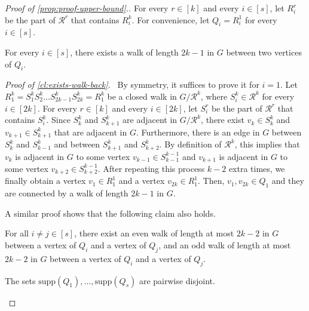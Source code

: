 \documentclass{article}
\newcommand{\supp}{\text{supp}}
\newcommand{\mydiamond}{\rotatebox[origin=c]{45}{$\vcenter{\hbox{$\Box$}}$}}
\newenvironment{subproof}[1]{\par\noindent \textit{Proof of #1.}\ }{\hfill \mydiamond \par\vspace{11pt}}
\begin{document}
\begin{proof}[Proof of \cref{prop:proof-upper-bound}.]
    For every $r \in [k]$ and every $i \in [s]$, let $R^r_i$ be the part of $\mathcal{R}^r$ that contains $R^k_i$.
    For convenience, let $Q_i = R^1_i$ for every $i \in [s]$.

    \begin{claim}\label{cl:exists-walk-back}
        For every $i \in [s]$, there exists a walk of length $2k-1$ in $G$ between two vertices of $Q_i$.
    \end{claim}

    \begin{subproof}{\cref{cl:exists-walk-back}}
        By symmetry, it suffices to prove it for $i = 1$.
        Let $R^k_1 = S^k_1S^k_2\ldots S^k_{2k-1}S^k_{2k} = R^k_1$ be a closed walk in $G/\mathcal{R}^k$, where $S^k_i \in \mathcal{R}^k$ for every $i \in [2k]$.
        For every $r \in [k]$ and every $i \in [2k]$, let $S^r_i$ be the part of $\mathcal{R}^r$ that contains $S^k_i$.
        Since $S^k_{k}$ and $S^k_{k+1}$ are adjacent in $G/\mathcal{R}^k$, there exist $v_{k} \in S^k_{k}$ and $v_{k+1} \in S^k_{k+1}$ that are adjacent in $G$.
        Furthermore, there is an edge in $G$ between $S^k_{k}$ and $S^k_{k-1}$ and between $S^k_{k+1}$ and $S^k_{k+2}$.
        By definition of $\mathcal{R}^k$, this implies that $v_{k}$ is adjacent in $G$ to some vertex $v_{k-1} \in S^{k-1}_{k-1}$ and $v_{k+1}$ is adjacent in $G$ to some vertex $v_{k+2} \in S^{k-1}_{k+2}$.
        After repeating this process $k-2$ extra times, we finally obtain a vertex $v_1 \in R^{1}_1$ and a vertex $v_{2k} \in R^{1}_1$.
        Then, $v_1, v_{2k} \in Q_1$ and they are connected by a walk of length $2k-1$ in $G$.
    \end{subproof}

    A similar proof shows that the following claim also holds.

    \begin{claim}\label{cl:exists-walk-between}
        For all $i \neq j \in [s]$, there exist an even walk of length at most $2k-2$ in $G$ between a vertex of $Q_i$ and a vertex of $Q_j$, and an odd walk of length at most $2k-2$ in $G$ between a vertex of $Q_i$ and a vertex of $Q_j$.
    \end{claim}

    \begin{claim}\label{cl:disjoint-supports}
        The sets $\supp(Q_1), \ldots, \supp(Q_{s})$ are pairwise disjoint.
    \end{claim}


\end{proof}
\end{document}
